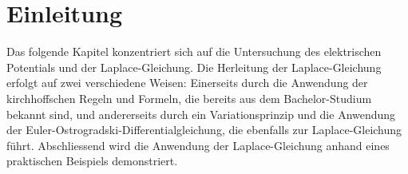 %
%
%
%
\section{Einleitung\label{circuit:section:teil0}}
Das folgende Kapitel konzentriert sich auf die Untersuchung des
elektrischen Potentials und der Laplace-Gleichung. Die Herleitung
der Laplace-Gleichung erfolgt auf zwei verschiedene Weisen: Einerseits
%
durch die Anwendung der kirchhoffschen Regeln und Formeln, die
bereits aus dem Bachelor-Studium bekannt sind, und andererseits
durch ein Variationsprinzip und die Anwendung der
Euler-Ostrogradski-Differentialgleichung, die ebenfalls zur
Laplace-Gleichung führt. Abschliessend wird die Anwendung der
Laplace-Gleichung anhand eines praktischen Beispiels demonstriert.




